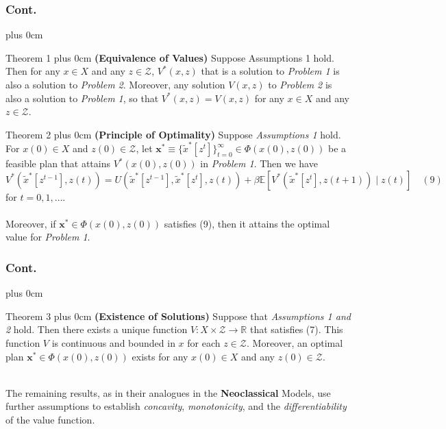 \documentclass[10pt]{beamer}
\renewcommand{\raggedright}{\leftskip=0pt \rightskip=0pt plus 0cm}
\begin{document}
\begin{frame}[c]\frametitle{Cont.}
		\raggedright
\begin{block}{Theorem 1}
\raggedright
    \textbf{(Equivalence of Values)} Suppose Assumptions 1 hold. Then for any \( x \in X \) and any \( z \in \mathcal{Z} \), \( V^*(x, z) \) that is a solution to \textit{Problem 1} is also a solution to \textit{Problem 2}. Moreover, any solution \( V(x, z) \) to \textit{Problem 2} is also a solution to \textit{Problem 1}, so that \( V^*(x, z) = V(x, z) \) for any \( x \in X \) and any \( z \in \mathcal{Z} \).
\end{block}
\begin{block}{Theorem 2}
\raggedright
    \textbf{(Principle of Optimality)} Suppose \textit{Assumptions 1} hold. For \( x(0) \in X \) and \( z(0) \in \mathcal{Z} \), let \( \mathbf{x}^* \equiv \{\tilde{x}^*[z^t]\}_{t=0}^\infty \in \Phi(x(0), z(0)) \) be a feasible plan that attains \( V^*(x(0), z(0)) \) in \textit{Problem 1}. Then we have
    \small
\[
V^*(\tilde{x}^*[z^{t-1}], z(t)) = U(\tilde{x}^*[z^{t-1}], \tilde{x}^*[z^t], z(t)) + \beta \mathbb{E}[V^*(\tilde{x}^*[z^t], z(t+1)) \mid z(t)] \quad (9)
\]
for \( t = 0, 1, \ldots \).\\
\normalsize
\quad 
\\Moreover, if \( \mathbf{x}^* \in \Phi(x(0), z(0)) \) satisfies (9), then it attains the optimal value for \textit{Problem 1}.
\end{block}
\end{frame}
\begin{frame}[c]\frametitle{Cont.}
		\raggedright
\begin{block}{Theorem 3}
\raggedright
    \textbf{(Existence of Solutions)} Suppose that \textit{Assumptions 1 and 2} hold. Then there exists a unique function \( V : X \times \mathcal{Z} \to \mathbb{R} \) that satisfies (7). This function \( V \) is continuous and bounded in \( x \) for each \( z \in \mathcal{Z} \). Moreover, an optimal plan \( \mathbf{x}^* \in \Phi(x(0), z(0)) \) exists for any \( x(0) \in X \) and any \( z(0) \in \mathcal{Z} \).
\end{block}
\quad \\
The remaining results, as in their analogues in the \textbf{Neoclassical} Models, use further assumptions to establish \textit{concavity}, \textit{monotonicity}, and the \textit{differentiability} of the value function.
\end{frame}
\end{document}
